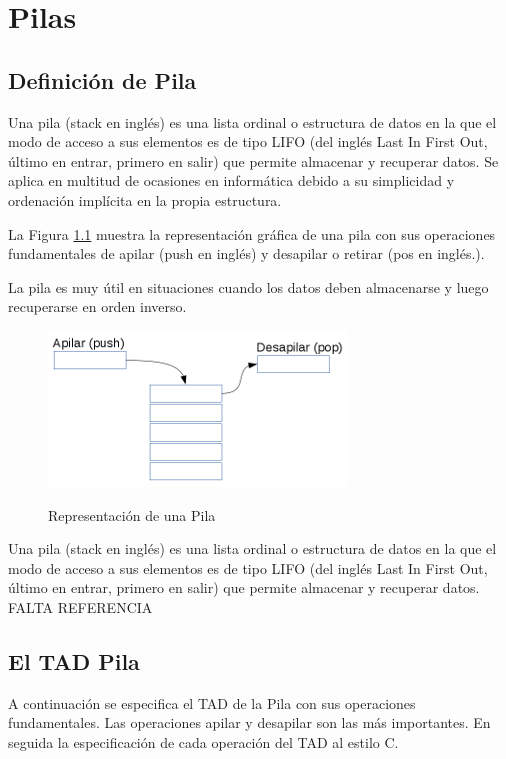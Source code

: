 \chapter{Pilas}

\section{Definición de Pila}
Una pila (stack en inglés) es una lista ordinal o estructura de datos en la que el modo de acceso a sus elementos es de tipo LIFO (del inglés Last In First Out, último en entrar, primero en salir) que permite almacenar y recuperar datos. Se aplica en multitud de ocasiones en informática debido a su simplicidad y ordenación implícita en la propia estructura. 

La Figura  \ref{fig:pila-representacion} muestra la representación gráfica de una pila con sus operaciones fundamentales de apilar (push en inglés) y desapilar o retirar (pos en inglés.).

La pila es muy útil en situaciones cuando los datos deben almacenarse y luego recuperarse en orden inverso.

\begin{figure}
	\centering\textbf{}
		\includegraphics{Diagramas/RepresentacionPila}
	\caption{Representación de una Pila}	
	\label{fig:pila-representacion}
\end{figure}

\begin{definicion}
Una pila (stack en inglés) es una lista ordinal o estructura de datos en la que el modo de acceso a sus elementos es de tipo LIFO (del inglés Last In First Out, último en entrar, primero en salir) que permite almacenar y recuperar datos. FALTA REFERENCIA
\end{definicion}

\section{El TAD Pila}
A continuación se especifica el TAD de la Pila con sus operaciones fundamentales. Las operaciones apilar y desapilar son las más importantes. En seguida la especificación de cada operación del TAD al estilo C.

